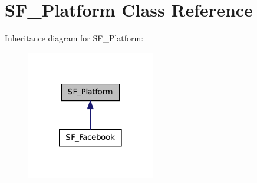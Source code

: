 \hypertarget{classSF__Platform}{
\section{SF\_\-Platform Class Reference}
\label{classSF__Platform}
}


Inheritance diagram for SF\_\-Platform:\nopagebreak
\begin{figure}[H]
\begin{center}
\leavevmode
\includegraphics[width=158pt]{classSF__Platform__inherit__graph}
\end{center}
\end{figure}
